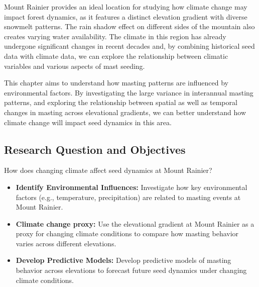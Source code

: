 \documentclass[11pt,letter]{article}
\begin{document}
Mount Rainier provides an ideal location for studying how climate change may impact forest dynamics, as it features a distinct elevation gradient with diverse snowmelt patterns. The rain shadow effect on different sides of the mountain also creates varying water availability. The climate in this region has already undergone significant changes in recent decades and, by combining historical seed data with climate data, we can explore the relationship between climatic variables and various aspects of mast seeding.

This chapter aims to understand how masting patterns are influenced by environmental factors. By investigating the large variance in interannual masting patterns, and exploring the relationship between spatial as well as temporal changes in masting across elevational gradients, we can better understand how climate change will impact seed dynamics in this area.

\subsection{Research Question and Objectives}
How does changing climate affect seed dynamics at Mount Rainier?
\begin{itemize}
\item\textbf{Identify Environmental Influences:} Investigate how key environmental factors (e.g., temperature, precipitation) are related to masting events at Mount Rainier.
\item\textbf{Climate change proxy:} Use the elevational gradient at Mount Rainier as a proxy for changing climate conditions to compare how masting behavior varies across different elevations.
\item\textbf{Develop Predictive Models:} Develop predictive models of masting behavior across elevations to forecast future seed dynamics under changing climate conditions.
\end{itemize}
\end{document}
